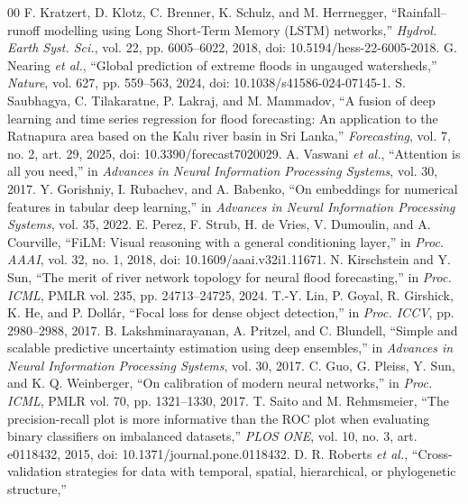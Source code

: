 \documentclass[conference]{IEEEtran}
\begin{document}
\begin{thebibliography}{00}
 F. Kratzert, D. Klotz, C. Brenner, K. Schulz, and
M. Herrnegger, ``Rainfall--runoff modelling using Long Short-Term Memory (LSTM)
networks,'' \emph{Hydrol. Earth Syst. Sci.}, vol. 22, pp. 6005--6022, 2018,
doi: 10.5194/hess-22-6005-2018.
 G. Nearing \emph{et al.}, ``Global prediction of extreme
floods in ungauged watersheds,'' \emph{Nature}, vol. 627, pp. 559--563, 2024,
doi: 10.1038/s41586-024-07145-1.
 S. Saubhagya, C. Tilakaratne, P. Lakraj, and
M. Mammadov, ``A fusion of deep learning and time series regression for flood
forecasting: An application to the Ratnapura area based on the Kalu river basin
in Sri Lanka,'' \emph{Forecasting}, vol. 7, no. 2, art. 29, 2025,
doi: 10.3390/forecast7020029.
 A. Vaswani \emph{et al.}, ``Attention is all you need,''
in \emph{Advances in Neural Information Processing Systems}, vol. 30, 2017.
 Y. Gorishniy, I. Rubachev, and A. Babenko, ``On
embeddings for numerical features in tabular deep learning,'' in
\emph{Advances in Neural Information Processing Systems}, vol. 35, 2022.
 E. Perez, F. Strub, H. de Vries, V. Dumoulin, and
A. Courville, ``FiLM: Visual reasoning with a general conditioning layer,''
in \emph{Proc. AAAI}, vol. 32, no. 1, 2018,
doi: 10.1609/aaai.v32i1.11671.
 N. Kirschstein and Y. Sun, ``The merit of river
network topology for neural flood forecasting,'' in \emph{Proc. ICML},
PMLR vol. 235, pp. 24713--24725, 2024.
 T.-Y. Lin, P. Goyal, R. Girshick, K. He, and P. Doll\'{a}r,
``Focal loss for dense object detection,'' in \emph{Proc. ICCV},
pp. 2980--2988, 2017.
 B. Lakshminarayanan, A. Pritzel, and C. Blundell,
``Simple and scalable predictive uncertainty estimation using deep ensembles,''
in \emph{Advances in Neural Information Processing Systems}, vol. 30, 2017.
 C. Guo, G. Pleiss, Y. Sun, and K. Q. Weinberger,
``On calibration of modern neural networks,'' in \emph{Proc. ICML},
PMLR vol. 70, pp. 1321--1330, 2017.
 T. Saito and M. Rehmsmeier, ``The precision-recall plot is
more informative than the ROC plot when evaluating binary classifiers on
imbalanced datasets,'' \emph{PLOS ONE}, vol. 10, no. 3, art. e0118432, 2015,
doi: 10.1371/journal.pone.0118432.
 D. R. Roberts \emph{et al.}, ``Cross-validation strategies
for data with temporal, spatial, hierarchical, or phylogenetic structure,''

\end{thebibliography}
\end{document}
